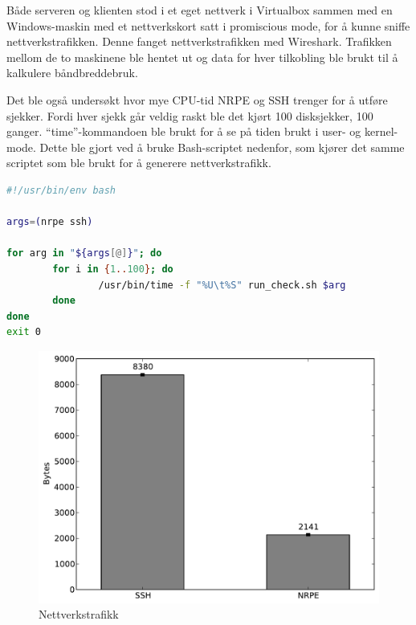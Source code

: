 Både serveren og klienten stod i et eget nettverk i Virtualbox sammen med en Windows-maskin med et nettverkskort satt i promiscious mode, for å kunne sniffe nettverkstrafikken. Denne fanget nettverkstrafikken med Wireshark. Trafikken mellom de to maskinene ble hentet ut og data for hver tilkobling ble brukt til å kalkulere båndbreddebruk.

Det ble også undersøkt hvor mye CPU-tid NRPE og SSH trenger for å utføre sjekker. Fordi hver sjekk går veldig raskt ble det kjørt 100 disksjekker, 100 ganger. ``time''-kommandoen ble brukt for å se på tiden brukt i user- og kernel-mode. Dette ble gjort ved å bruke Bash-scriptet nedenfor, som kjører det samme scriptet som ble brukt for å generere nettverkstrafikk.

\begin{lstlisting}[language=bash]
#!/usr/bin/env bash

args=(nrpe ssh)

for arg in "${args[@]}"; do
        for i in {1..100}; do
                /usr/bin/time -f "%U\t%S" run_check.sh $arg
        done
done
exit 0
\end{lstlisting}

\begin{figure}[H]
    \centering
    \includegraphics[scale=0.6]{img/nettverkstrafikk}
    \caption{Nettverkstrafikk}
    \label{network_traffic}
\end{figure}

